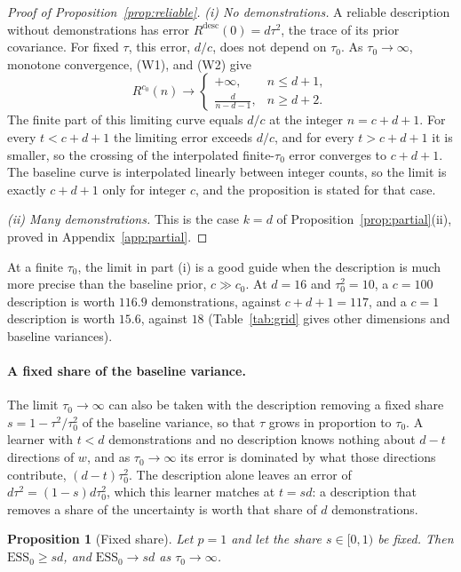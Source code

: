 \documentclass{article}
\newtheorem{proposition}[theorem]{Proposition}
\theoremstyle{definition}
\newcommand{\ess}{\mathrm{ESS}}
\begin{document}
\begin{proof}[Proof of Proposition~\ref{prop:reliable}]
\emph{(i) No demonstrations.}
A reliable description without demonstrations has error $R^{\mathrm{desc}}(0)=d\tau^2$, the trace of its prior covariance. For fixed $\tau$, this error, $d/c$, does not depend on $\tau_0$. As $\tau_0\to\infty$, monotone convergence, (W1), and (W2) give
\[
R^{c_0}(n)\longrightarrow
\begin{cases}
+\infty,&n\le d+1,\\[2pt]
\displaystyle\frac{d}{n-d-1},&n\ge d+2.
\end{cases}
\]
The finite part of this limiting curve equals $d/c$ at the integer $n=c+d+1$. For every $t<c+d+1$ the limiting error exceeds $d/c$, and for every $t>c+d+1$ it is smaller, so the crossing of the interpolated finite-$\tau_0$ error converges to $c+d+1$. The baseline curve is interpolated linearly between integer counts, so the limit is exactly $c+d+1$ only for integer $c$, and the proposition is stated for that case.

\emph{(ii) Many demonstrations.}
This is the case $k=d$ of Proposition~\ref{prop:partial}(ii), proved in Appendix~\ref{app:partial}.
\end{proof}

At a finite $\tau_0$, the limit in part (i) is a good guide when the description is much more precise than the baseline prior, $c\gg c_0$. At $d=16$ and $\tau_0^2=10$, a $c=100$ description is worth $116.9$ demonstrations, against $c+d+1=117$, and a $c=1$ description is worth $15.6$, against $18$ (Table~\ref{tab:grid} gives other dimensions and baseline variances).

\paragraph{A fixed share of the baseline variance.}
The limit $\tau_0\to\infty$ can also be taken with the description removing a fixed share $s=1-\tau^2/\tau_0^2$ of the baseline variance, so that $\tau$ grows in proportion to $\tau_0$. A learner with $t<d$ demonstrations and no description knows nothing about $d-t$ directions of $w$, and as $\tau_0\to\infty$ its error is dominated by what those directions contribute, $(d-t)\tau_0^2$. The description alone leaves an error of $d\tau^2=(1-s)d\tau_0^2$, which this learner matches at $t=sd$: a description that removes a share of the uncertainty is worth that share of $d$ demonstrations.

\begin{proposition}[Fixed share]\label{prop:share}
Let $p=1$ and let the share $s\in[0,1)$ be fixed. Then $\ess_0\geq sd$, and $\ess_0\to sd$ as $\tau_0\to\infty$.
\end{proposition}
\end{document}
